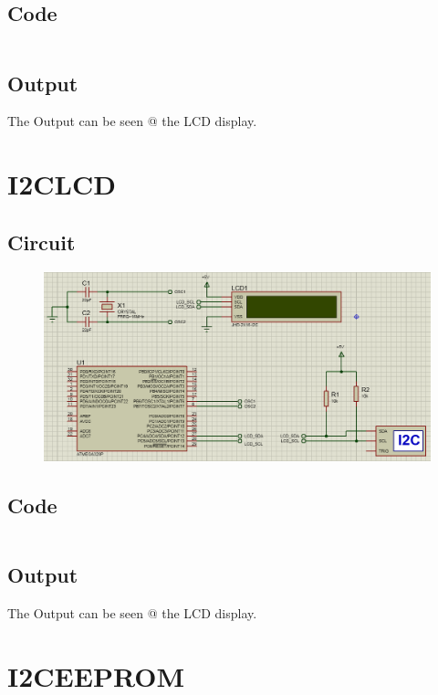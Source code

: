 \documentclass[oneside]{book}
\begin{document}
\subsection{Code}
\inputminted[bgcolor=black]{c}{../programFiles/SPILCD.c}

\subsection{Output}
\quad The Output can be seen @ the LCD display.

\section{I2CLCD}
\subsection{Circuit}
\begin{figure}[H]
    \centering
    \includegraphics[height=0.2\textheight]{I2CLCD.png}
\end{figure}
\subsection{Code}
\inputminted[bgcolor=black]{c}{../programFiles/I2CLCD.c}

\subsection{Output}
\quad The Output can be seen @ the LCD display.



\section{I2CEEPROM}
\end{document}
